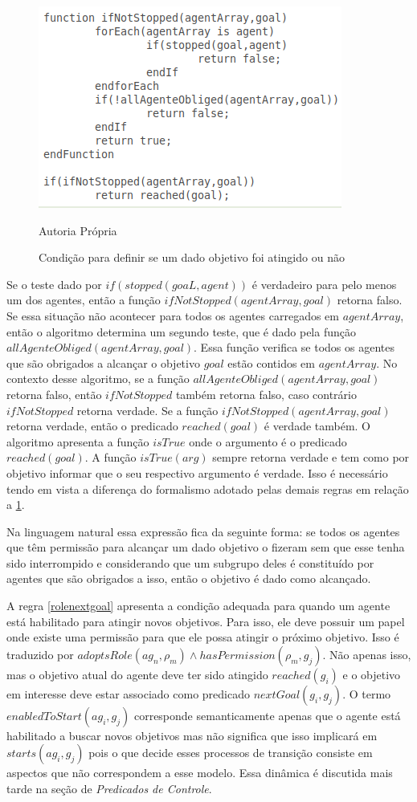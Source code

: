 \begin{figure}[H]
  \centering
  \caption{Condição para definir se um dado objetivo foi atingido ou não} 
  \includegraphics[width=0.6\linewidth]{figure/algrule6.png} 
  \begin{center}
  	Autoria Própria
  \end{center}
  \label{wenStop}  
\end{figure}

Se o teste dado por $if(stopped(goaL,agent))$ é verdadeiro para pelo menos um dos agentes, então a função $ifNotStopped(agentArray,goal)$ retorna falso. Se essa situação não acontecer para todos os agentes carregados em $agentArray$, então o algoritmo determina um segundo teste, que é dado pela função $allAgenteObliged(agentArray,goal)$. Essa função verifica se todos os agentes que são obrigados a alcançar o objetivo $goal$ estão contidos em $agentArray$. No contexto desse algoritmo, se a função $allAgenteObliged(agentArray,goal)$ retorna falso, então $ifNotStopped$ também retorna falso, caso contrário $ifNotStopped$ retorna verdade. Se a função $ifNotStopped(agentArray,goal)$ retorna verdade, então o predicado $reached(goal)$ é verdade também. O algoritmo apresenta a função $isTrue$ onde o argumento é o predicado $reached(goal)$. A função $isTrue(arg)$ sempre retorna verdade e tem como por objetivo informar que o seu respectivo argumento é verdade. Isso é necessário tendo em vista a diferença do formalismo adotado pelas demais regras em relação a \ref{wenStop}.

Na linguagem natural essa expressão fica da seguinte forma: se todos os agentes que têm permissão para alcançar um dado objetivo o fizeram sem que esse tenha sido interrompido e considerando que um subgrupo deles é constituído por agentes que são obrigados a isso, então o objetivo é dado como alcançado.

A regra \ref{rolenextgoal} apresenta a condição adequada para quando um agente está habilitado para atingir novos objetivos. Para isso, ele deve possuir um papel onde existe uma permissão para que ele possa atingir o próximo objetivo. Isso é traduzido por $ adoptsRole(ag_n,\rho_m) \wedge hasPermission(\rho_m,g_j) $. Não apenas isso, mas o objetivo atual do agente deve ter sido atingido $ reached(g_i) $ e o objetivo em interesse deve estar associado como predicado $nextGoal(g_i,g_j)$. O termo $enabledToStart(ag_i,g_j)$ corresponde semanticamente apenas que o agente está habilitado a buscar novos objetivos mas não significa que isso implicará em $starts(ag_i,g_j)$ pois o que decide esses processos de transição consiste em aspectos que não correspondem a esse modelo. Essa dinâmica é discutida mais tarde na seção de \textit{Predicados de Controle}.

